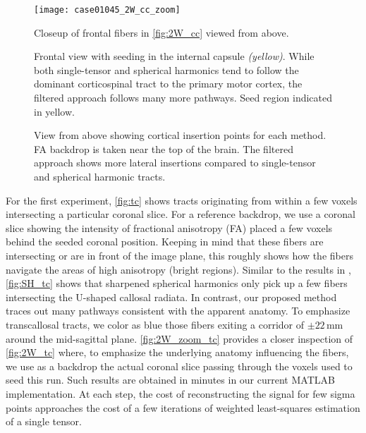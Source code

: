 \documentclass[letterpaper,hyperref,12pt]{gatech-thesis}
\begin{document}
\begin{figure}[t]
  \centering
  \texttt{[image: case01045\_2W\_cc\_zoom]}
  \caption{Closeup of frontal fibers in \autoref{fig:2W_cc} viewed from
    above.}
  \label{fig:frontal}
\end{figure}
\begin{figure}[t]
  \centering
 \caption{Frontal view with seeding in the internal capsule \textit{(yellow)}.
    While both single-tensor and spherical harmonics tend to follow the
    dominant corticospinal tract to the primary motor cortex, the filtered
    approach follows many more pathways.  Seed region indicated in yellow.}
  \label{fig:ic_front}
\end{figure}
\begin{figure}[t]
  \centering
 \caption{View from above showing cortical insertion points for each method.
    FA backdrop is taken near the top of the brain.  The filtered approach
    shows more lateral insertions compared to single-tensor and spherical
    harmonic tracts.}
  \label{fig:ic_top}
\end{figure}
For the first experiment, \autoref{fig:tc} shows tracts originating from
within a few voxels intersecting a particular coronal slice.  For a reference
backdrop, we use a coronal slice showing the intensity of fractional
anisotropy (FA) placed a few voxels behind the seeded coronal position.
Keeping in mind that these fibers are intersecting or are in front of the
image plane, this roughly shows how the fibers navigate the areas of high
anisotropy (bright regions).  Similar to the results in
\cite{Descoteaux2009tmi,Schultz2008}, \autoref{fig:SH_tc} shows that sharpened
spherical harmonics only pick up a few fibers intersecting the U-shaped
callosal radiata.  In contrast, our proposed method traces out many pathways
consistent with the apparent anatomy.  To emphasize transcallosal tracts, we
color as blue those fibers exiting a corridor of $\pm22\,\text{mm}$ around the
mid-sagittal plane.  \autoref{fig:2W_zoom_tc} provides a closer inspection of
\autoref{fig:2W_tc} where, to emphasize the underlying anatomy influencing the
fibers, we use as a backdrop the actual coronal slice passing through the
voxels used to seed this run.  Such results are obtained in minutes in our
current MATLAB implementation.  At each step, the cost of reconstructing the
signal for few sigma points approaches the cost of a few iterations of
weighted least-squares estimation of a single tensor.
\end{document}
